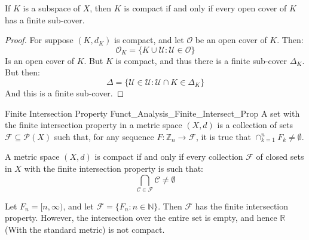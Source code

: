             \begin{theorem}
                If $K$ is a subspace of $X$, then $K$ is compact
                if and only if every open cover of $K$ has a
                finite sub-cover.
            \end{theorem}
            \begin{proof}
                For suppose $(K,d_{K})$ is compact, and let
                $\mathcal{O}$ be an open cover of $K$. Then:
                \begin{equation}
                    \mathcal{O}_{K}=\{K\cup\mathcal{U}:
                        \mathcal{U}\in\mathcal{O}\}
                \end{equation}
                Is an open cover of $K$. But $K$ is compact,
                and thus there is a finite sub-cover
                $\Delta_{K}$. But then:
                \begin{equation}
                    \Delta=\{\mathcal{U}\in\mathcal{U}:
                             \mathcal{U}\cap{K}\in\Delta_{K}\}
                \end{equation}
                And this is a finite sub-cover.
            \end{proof}
            \begin{ldefinition}{Finite Intersection Property}
                  {Funct_Analysis_Finite_Intersect_Prop}
                A set with the finite intersection property
                in a metric space $(X,d)$ is a collection of sets
                $\mathscr{F}\subseteq\mathcal{P}(X)$ such that,
                for any sequence
                $F:\mathbb{Z}_{n}\rightarrow\mathscr{F}$, 
                it is true that $\cap_{k=1}^{n}F_{k}\ne\emptyset$.
            \end{ldefinition}
            \begin{theorem}
                A metric space $(X,d)$ is compact if and only if
                every collection $\mathscr{F}$ of closed sets in
                $X$ with the
                finite intersection property is such that:
                \begin{equation}
                    \bigcap_{\mathcal{C}\in\mathcal{F}}
                        \mathcal{C}\ne\emptyset
                \end{equation}
            \end{theorem}
            \begin{lexample}
                Let $F_{n}=[n,\infty)$, and let
                $\mathscr{F}=\{F_{n}:n\in\mathbb{N}\}$.
                Then $\mathscr{F}$ has the finite intersection
                property. However, the intersection over the
                entire set is empty, and hence $\mathbb{R}$
                (With the standard metric) is not compact.
            \end{lexample}
